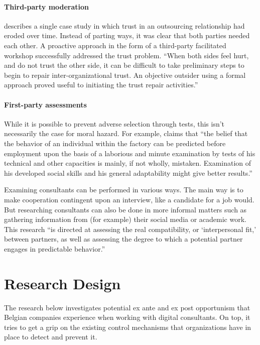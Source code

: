 \documentclass[12pt]{article}
\begin{document}
\paragraph{Third-party moderation}\label{third-party-moderation}

\citet[6-7]{babin2017} describes a single case study in which trust in
an outsourcing relationship had eroded over time. Instead of parting
ways, it was clear that both parties needed each other. A proactive
approach in the form of a third-party facilitated workshop successfully
addressed the trust problem. ``When both sides feel hurt, and do not
trust the other side, it can be difficult to take preliminary steps to
begin to repair inter-organizational trust. An objective outsider using
a formal approach proved useful to initiating the trust repair
activities.''

\paragraph{First-party assessments}\label{first-party-assessments}

While it is possible to prevent adverse selection through tests, this
isn't necessarily the case for moral hazard. For example,
\citet[111]{mayo1945} claims that ``the belief that the behavior of an
individual within the factory can be predicted before employment upon
the basis of a laborious and minute examination by tests of his
technical and other capacities is mainly, if not wholly, mistaken.
Examination of his developed social skills and his general adaptability
might give better results.''

Examining consultants can be performed in various ways. The main way is
to make cooperation contingent upon an interview, like a candidate for a
job would. But researching consultants can also be done in more informal
matters such as gathering information from (for example) their social
media or academic work. This research ``is directed at assessing the
real compatibility, or `interpersonal fit,' between partners, as well as
assessing the degree to which a potential partner engages in predictable
behavior.'' \citep[ 370]{shapiro1992}

\section{Research Design}\label{research-design}

The research below investigates potential ex ante and ex post
opportunism that Belgian companies experience when working with digital
consultants. On top, it tries to get a grip on the existing control
mechanisms that organizations have in place to detect and prevent it.
\end{document}
